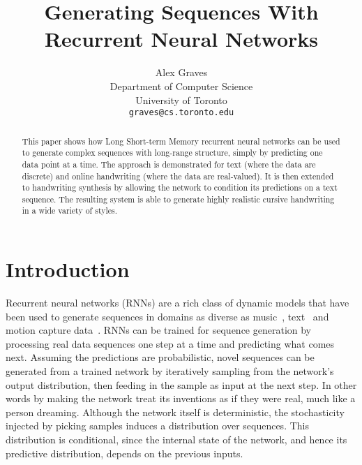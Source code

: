 \documentclass{article}
\begin{document}
\title{Generating Sequences With\\Recurrent Neural Networks}
\author{Alex Graves\\Department of Computer Science\\University of Toronto\\ \texttt{graves@cs.toronto.edu}}
\date{}
\maketitle
\begin{abstract}
This paper shows how Long Short-term Memory recurrent neural networks can be used to generate complex sequences with long-range structure, simply by predicting one data point at a time. 
The approach is demonstrated for text (where the data are discrete) and online handwriting (where the data are real-valued). 
It is then extended to handwriting synthesis by allowing the network to condition its predictions on a text sequence. 
The resulting system is able to generate highly realistic cursive handwriting in a wide variety of styles.
\end{abstract}

\section{Introduction}

Recurrent neural networks (RNNs) are a rich class of dynamic models that have been used to generate sequences in domains as diverse as music~\cite{eck02music,boulanger12music}, text~\cite{sutskever11rnn} and motion capture data~\cite{sutskever08rtbm}.
RNNs can be trained for sequence generation by processing real data sequences one step at a time and  predicting what comes next.
Assuming the predictions are probabilistic, novel sequences can be generated from a trained network by iteratively sampling from the network's output distribution, then feeding in the sample as input at the next step. 
In other words by making the network treat its inventions as if they were real, much like a person dreaming.
Although the network itself is deterministic, the stochasticity injected by picking samples induces a distribution over sequences.
This distribution is conditional, since the internal state of the network, and hence its predictive distribution, depends on the previous inputs.
\end{document}
